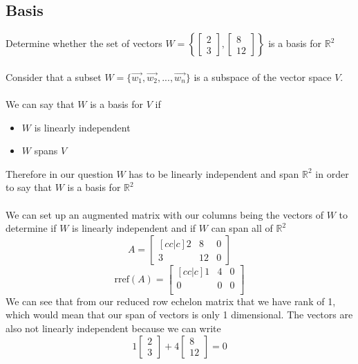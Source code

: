 \documentclass[12pt]{article}
\begin{document}
\subsection{Basis}
Determine whether the set of vectors  $ W = \left\{\begin{bmatrix}2 \\ 3\end{bmatrix},\begin{bmatrix}8 \\ 12\end{bmatrix}\right\}$ is a basis for $\mathbb{R}^2$
\\\\
Consider that a subset $W = \{\vec{w_1},\vec{w_2},...,\vec{w_n}\}$ is a subspace of the vector space $V$.
\\\\ We can say that $W$ is a basis for $V$ if 
\begin{itemize}
  \item $W$ is linearly independent
  \item $W$ spans $V$
\end{itemize}
Therefore in our question $W$ has to be linearly independent and span $\mathbb{R}^2$ in order to say that $W$ is a basis for $\mathbb{R}^2$
\\\\ We can set up an augmented matrix with our columns being the vectors of $W$ to determine if $W$ is linearly independent and if $W$ can span all of $\mathbb{R}^2$
\begin{equation*}
A = 
 \begin{bmatrix}[cc|c] 
2 & 8 & 0 \\
3 & 12 &0
\end{bmatrix}
\end{equation*}
\begin{equation*}
\text{rref}(A) = 
 \begin{bmatrix}[cc|c] 
 1 & 4 & 0\\
 0 & 0 & 0\\
\end{bmatrix}
\end{equation*}
We can see that from our reduced row echelon matrix that we have rank of 1, which would mean that our span of vectors is only 1 dimensional. The vectors are also not linearly independent because we can write
\begin{equation*}
1 \begin{bmatrix} 2 \\ 3 \end{bmatrix}+
4  \begin{bmatrix} 8 \\ 12 \end{bmatrix}
 = 0
\end{equation*}
\end{document}
